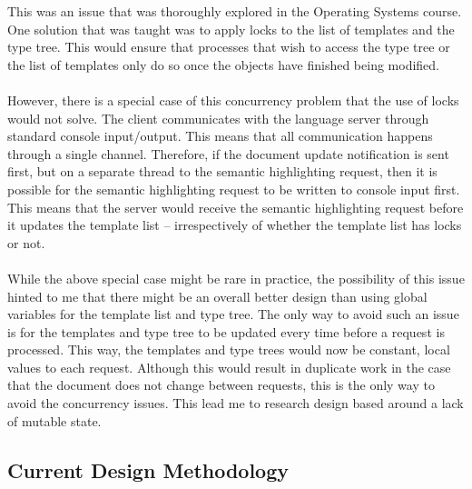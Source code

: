 \documentclass[../main.tex]{subfiles}
\begin{document}
This was an issue that was thoroughly explored in the Operating Systems course. One solution that was taught was to apply locks to the list of templates and the type tree. This would ensure that processes that wish to access the type tree or the list of templates only do so once the objects have finished being modified.
\\
\\
However, there is a special case of this concurrency problem that the use of locks would not solve. The client communicates with the language server through standard console input/output. This means that all communication happens through a single channel. Therefore, if the document update notification is sent first, but on a separate thread to the semantic highlighting request, then it is possible for the semantic highlighting request to be written to console input first. This means that the server would receive the semantic highlighting request before it updates the template list -- irrespectively of whether the template list has locks or not.
\\
\\
While the above special case might be rare in practice, the possibility of this issue hinted to me that there might be an overall better design than using global variables for the template list and type tree. The only way to avoid such an issue is for the templates and type tree to be updated every time before a request is processed. This way, the templates and type trees would now be constant, local values to each request. Although this would result in duplicate work in the case that the document does not change between requests, this is the only way to avoid the concurrency issues. This lead me to research design based around a lack of mutable state.

\subsection{Current Design Methodology}
\end{document}
